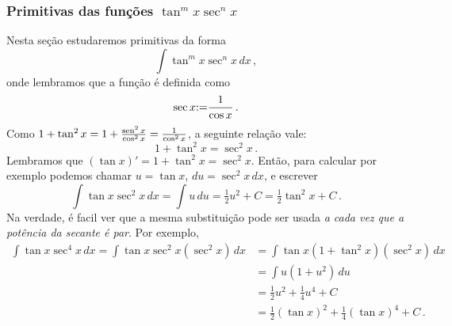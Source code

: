 \subsubsection{Primitivas das funções $\tan^mx\sec^nx$}
Nesta seção estudaremos primitivas da forma
$$\int \tan^mx\sec^nx\,dx\,,$$
onde lembramos que a função  é definida como 
$$
\sec x{:=} \frac{1}{\cos x}\,.$$
Como $1+\tan^2x=1+\frac{\operatorname{sen}^2x}{\cos^2x}=\frac{1}{\cos^2x}$,
a seguinte relação vale: 
$$1+\tan^2x=\sec^2x\,.$$
Lembramos que
$(\tan x)' =1+\tan^2x=\sec^2x$.
Então, para calcular por exemplo 
podemos chamar $u=\tan x$, $du=\sec^2x \,dx$, e escrever
$$
\int\tan x\sec^2x\,dx=
\int u\,du=\tfrac{1}{2}u^2+C=\tfrac12 \tan^2x+C\,.
$$
Na verdade, é facil ver que a mesma substituição pode ser usada \emph{a cada
vez que a potência da secante é par}. Por exemplo,
\begin{align*}
\int\tan x\sec^4x\,dx=\int \tan x\sec^2 x(\sec^2x)\,dx&=
\int \tan x(1+\tan^2x)(\sec^2x)\,dx\\
&=\int u(1+u^2)\,du\\
&=\tfrac12 u^2+\tfrac14 u^4+C\\
&=\tfrac12 (\tan x)^2+\tfrac14(\tan x)^4+C\,.
\end{align*}

